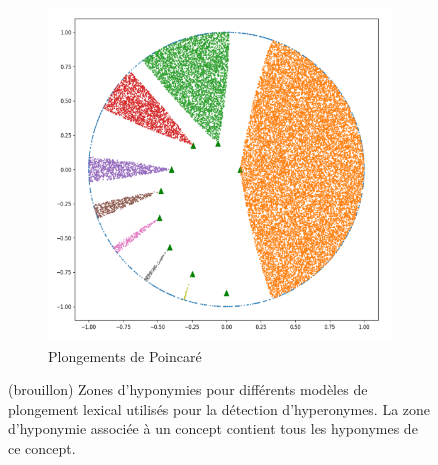 \begin{figure}[h]
\begin{subfigure}{.33\textwidth}
    \end{subfigure}
    \begin{subfigure}{.33\textwidth}
          \centering
          \includegraphics[width=.8\linewidth]{img/emb-poincone.png}  
          \caption{Plongements de Poincaré}
          \label{subfig:poincone}
    \end{subfigure}
    \caption[Plongements lexicaux spécifiques à l'hyperonymie]{(brouillon) Zones d'hyponymies pour  différents modèles de plongement lexical utilisés pour la détection d'hyperonymes. La zone d'hyponymie associée à un concept contient tous les hyponymes de ce concept.}
    \label{fig:litt-emb-models}
\end{figure}


